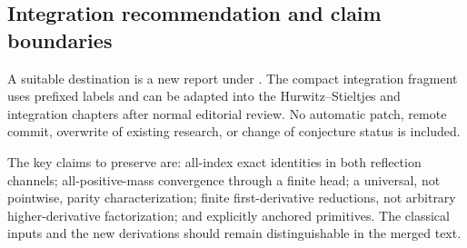 \subsection{Integration recommendation and claim boundaries}
A suitable destination is a new report under
.
The compact integration fragment uses prefixed labels and can be adapted
into the Hurwitz--Stieltjes and integration chapters after normal editorial
review. No automatic patch, remote commit, overwrite of existing research,
or change of conjecture status is included.

The key claims to preserve are: all-index exact identities in both
reflection channels; all-positive-mass convergence through a finite head;
a universal, not pointwise, parity characterization; finite first-derivative
reductions, not arbitrary higher-derivative factorization; and explicitly
anchored primitives. The classical inputs and the new derivations should
remain distinguishable in the merged text.

